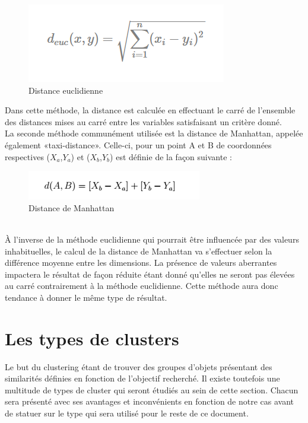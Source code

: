\documentclass[memoire.tex]{subfiles}
\begin{document}
	\begin{figure}[h!]
		\centerline{\includegraphics[scale=0.8]{img/euclidienne_distance.png}}
		\caption{Distance euclidienne}
	\end{figure}
Dans cette méthode, la distance est calculée en effectuant le carré de l'ensemble des distances mises au carré entre les variables satisfaisant un critère donné.\\
La seconde méthode communément utilisée est la distance de Manhattan, appelée également «taxi-distance». Celle-ci, pour un point A et B de coordonnées respectives ($X_{a}$,$Y_{a}$) et ($X_{b}$,$Y_{b}$) est définie de la façon  suivante :\\
	\begin{figure}[h!]
		\centerline{\includegraphics[scale=0.8]{img/manhatan_distance.png}}
		\caption{Distance de Manhattan}
	\end{figure}\\
À l'inverse de la méthode euclidienne qui pourrait être influencée par des valeurs inhabituelles, le calcul de la distance de Manhattan va s'effectuer selon la différence moyenne entre les dimensions. La présence de valeurs aberrantes impactera le résultat de façon réduite étant donné qu'elles ne seront pas élevées au carré contrairement à la méthode euclidienne. Cette méthode aura donc tendance à donner le même type de résultat.
\newpage


\section{Les types de clusters}

Le but du clustering étant de trouver des groupes d'objets présentant des similarités
définies en fonction de l'objectif recherché. Il existe toutefois une multitude de types de cluster qui seront étudiés au sein de cette section. Chacun sera présenté avec ses avantages et inconvénients en fonction de notre cas avant de statuer sur le type qui sera utilisé pour le reste de ce document.
\end{document}
